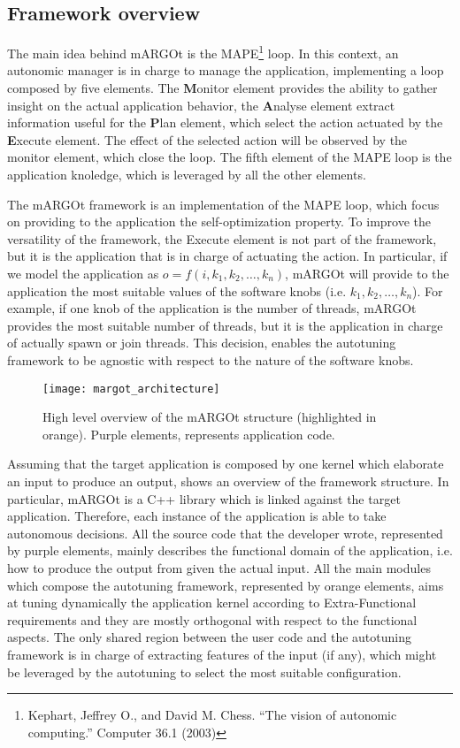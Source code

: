 \subsection{Framework overview}

The main idea behind mARGOt is the MAPE\footnote{Kephart, Jeffrey O., and David M. Chess. ``The vision of autonomic computing.'' Computer 36.1 (2003)} loop.
In this context, an autonomic manager is in charge to manage the application, implementing a loop composed by five elements.
The \textbf{M}onitor element provides the ability to gather insight on the actual application behavior, the \textbf{A}nalyse element extract information useful for the \textbf{P}lan element, which select the action actuated by the \textbf{E}xecute element.
The effect of the selected action will be observed by the monitor element, which close the loop.
The fifth element of the MAPE loop is the application knoledge, which is leveraged by all the other elements.

The mARGOt framework is an implementation of the MAPE loop, which focus on providing to the application the self-optimization property.
To improve the versatility of the framework, the Execute element is not part of the framework, but it is the application that is in charge of actuating the action.
In particular, if we model the application as $o = f(i,k_1,k_2,\ldots,k_n)$, mARGOt will provide to the application the most suitable values of the software knobs (i.e. $k_1,k_2,\ldots,k_n$).
For example, if one knob of the application is the number of threads, mARGOt provides the most suitable number of threads, but it is the application in charge of actually spawn or join threads.
This decision, enables the autotuning framework to be agnostic with respect to the nature of the software knobs.


\begin{figure}
	\centering
	\texttt{[image: margot\_architecture]}
	\caption{High level overview of the mARGOt structure (highlighted in orange). Purple elements, represents application code. }
	\label{fig:framework_overview}
\end{figure}


Assuming that the target application is composed by one kernel which elaborate an input to produce an output,  shows an overview of the framework structure.
In particular, mARGOt is a C++ library which is linked against the target application.
Therefore, each instance of the application is able to take autonomous decisions.
All the source code that the developer wrote, represented by purple elements, mainly describes the functional domain of the application, i.e. how to produce the output from given the actual input.
All the main modules which compose the autotuning framework, represented by orange elements, aims at tuning dynamically the application kernel according to Extra-Functional requirements and they are mostly orthogonal with respect to the functional aspects.
The only shared region between the user code and the autotuning framework is in charge of extracting features of the input (if any), which might be leveraged by the autotuning to select the most suitable configuration.


